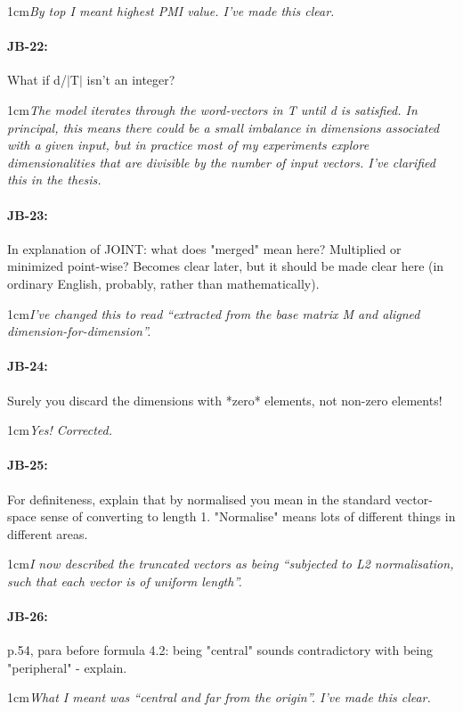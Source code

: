 \documentclass[11pt,a4paper]{article}
\newcommand{\res}[1]{\vspace{0.25cm} \begin{adjustwidth}{1cm}{}\emph{#1}\end{adjustwidth}}
\begin{document}
\res{By top I meant highest PMI value.  I've made this clear.}

\paragraph{JB-22:} What if d/$|$T$|$ isn't an integer?

\res{The model iterates through the word-vectors in T until d is satisfied.  In principal, this means there could be a small imbalance in dimensions associated with a given input, but in practice most of my experiments explore dimensionalities that are divisible by the number of input vectors.  I've clarified this in the thesis.}

\paragraph{JB-23:} In explanation of JOINT: what does "merged" mean here? Multiplied or minimized point-wise? Becomes clear later, but it should be made clear here (in ordinary English, probably, rather than mathematically).

\res{I've changed this to read ``extracted from the base matrix M and aligned dimension-for-dimension''.}

\paragraph{JB-24:} Surely you discard the dimensions with *zero* elements, not non-zero elements!

\res{Yes!  Corrected.}

\paragraph{JB-25:} For definiteness, explain that by normalised you mean in the standard vector-space sense of converting to length 1. "Normalise" means lots of different things in different areas.

\res{I now described the truncated vectors as being ``subjected to L2 normalisation, such that each vector is of uniform length''.}

\paragraph{JB-26:} p.54, para before formula 4.2: being "central" sounds contradictory with being "peripheral" - explain.

\res{What I meant was ``central and far from the origin''.  I've made this clear.}
\end{document}
